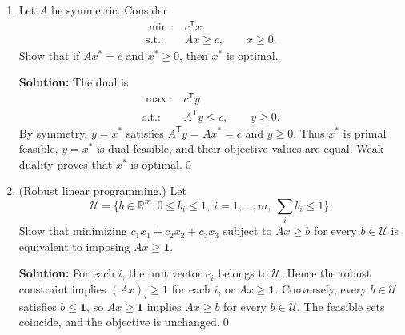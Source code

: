 \documentclass[11pt]{article}
\newcommand{\R}{\mathbb R}
\newcommand{\T}{^{\mathsf T}}
\newcommand{\ones}{\mathbf 1}
\newcommand{\solution}{\par\medskip\noindent\textbf{Solution:} }
\newcommand{\finishsolution}{\qed\par}
\begin{document}
\begin{enumerate}
\begin{enumerate}
\item Show that the best lower bound in part (a) is equal to $v$.

\solution Introduce a scalar $t$. The original problem is equivalent to
\[
\begin{array}{rl}
\min:&t\\
\text{s.t.}:&Ax-t\ones\le b,\qquad x,t\text{ free}.
\end{array}
\]
To obtain its dual, take the infimum over $x,t$ after introducing
nonnegative multipliers $p$:
\[
\sup_{p\ge0}\inf_{x,t}
\big[t+p\T(Ax-t\ones-b)\big]
=\sup_{p\ge0}\inf_{x,t}
\big[(A\T p)\T x+(1-\ones\T p)t-p\T b\big].
\]
Since $x$ and $t$ are free, avoiding an inner value of $-\infty$ requires
$A\T p=0$ and $\ones\T p=1$. Thus the dual is
\[
\begin{array}{rl}
\max:&-p\T b\\
\text{s.t.}:&A\T p=0,\\
&\ones\T p=1,\\
&p\ge0.
\end{array}
\]
The primal is feasible, for example at $x=0$ and $t=\max_i(-b_i)$,
and has finite value by assumption. By LP attainment and strong duality,
the dual has an optimal solution with value $v$.\finishsolution
\end{enumerate}

\item Let $A$ be symmetric. Consider
\[
\begin{array}{rl}
\min:&c\T x\\
\text{s.t.}:&Ax\ge c,\qquad x\ge0.
\end{array}
\]
Show that if $Ax^*=c$ and $x^*\ge0$, then $x^*$ is optimal.

\solution The dual is
\[
\begin{array}{rl}
\max:&c\T y\\
\text{s.t.}:&A\T y\le c,\qquad y\ge0.
\end{array}
\]
By symmetry, $y=x^*$ satisfies $A\T y=Ax^*=c$ and $y\ge0$.
Thus $x^*$ is primal feasible, $y=x^*$ is dual feasible, and their
objective values are equal. Weak duality proves that $x^*$ is optimal.\finishsolution

\item (Robust linear programming.) Let
\[
\mathcal U=\{b\in\R^m:0\le b_i\le1,\ i=1,\ldots,m,\
\textstyle\sum_i b_i\le1\}.
\]
Show that minimizing $c_1x_1+c_2x_2+c_3x_3$ subject to $Ax\ge b$ for
every $b\in\mathcal U$ is equivalent to imposing $Ax\ge\ones$.

\solution For each $i$, the unit vector $e_i$ belongs to $\mathcal U$.
Hence the robust constraint implies $(Ax)_i\ge1$ for each $i$, or
$Ax\ge\ones$. Conversely, every $b\in\mathcal U$ satisfies $b\le\ones$,
so $Ax\ge\ones$ implies $Ax\ge b$ for every $b\in\mathcal U$.
The feasible sets coincide, and the objective is unchanged.\finishsolution


\end{enumerate}
\end{document}

